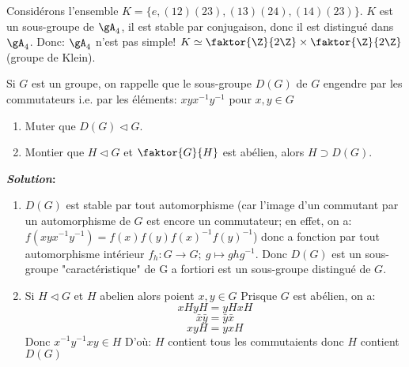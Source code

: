\begin{exercise}
\begin{enumerate}
	\end{enumerate}


	\begin{remark}
		Considérons l'ensemble $K=\{e, (12)(23), (13)(24), (14)(23)\}$. $K$ est un sous-groupe de $\gA_4$, il est stable par conjugaison, donc il est distingué dans $\gA_4$. Donc: $\gA_4$ n'est pas simple! $K\simeq \faktor{\Z}{2\Z}\times\faktor{\Z}{2\Z}$ (groupe de Klein).
	\end{remark}

\end{exercise}

\begin{exercise}

	Si $G$ est un groupe, on rappelle que le sous-groupe $D(G)$ de $G$ engendre par les commutateurs i.e. par les éléments: $xyx^{-1}y^{-1}$ pour $x,y\in G$

	\begin{enumerate}
		\item Muter que $D(G)\vartriangleleft G$.
		\item Montier que $H\vartriangleleft G$ et $\faktor{G}{H}$ est abélien, alors $H\supset D(G)$.
	\end{enumerate}

	\textbf{\emph{Solution}:}

	\begin{enumerate}
		\item $D(G)$ est stable par tout automorphisme (car l'image d'un commutant par un automorphisme de $G$ est encore un commutateur; en effet, on a:
		$f(xyx^{-1}y^{-1})=f(x)f(y)f(x)^{-1}f(y)^{-1}$)
		donc a fonction par tout automorphisme intérieur $f_h:G\rightarrow G;\ g\mapsto ghg^{-1}$. Donc $D(G)$ est un sous-groupe "caractéristique" de G a fortiori est un sous-groupe distingué de $G$.
		\item Si $H\vartriangleleft G$ et $H$ abelien alors poient $x,y\in G$ Prisque $G$ est abélien, on a:
		$$xH yH=yH xH$$
		$$\bar x \bar y=\bar y\bar x$$
		$$xyH=yxH$$
		Donc $x^{-1}y^{-1}xy\in H$ D'où: $H$ contient tous les commutaients donc $H$ contient $D(G)$
	\end{enumerate}

\end{exercise}

